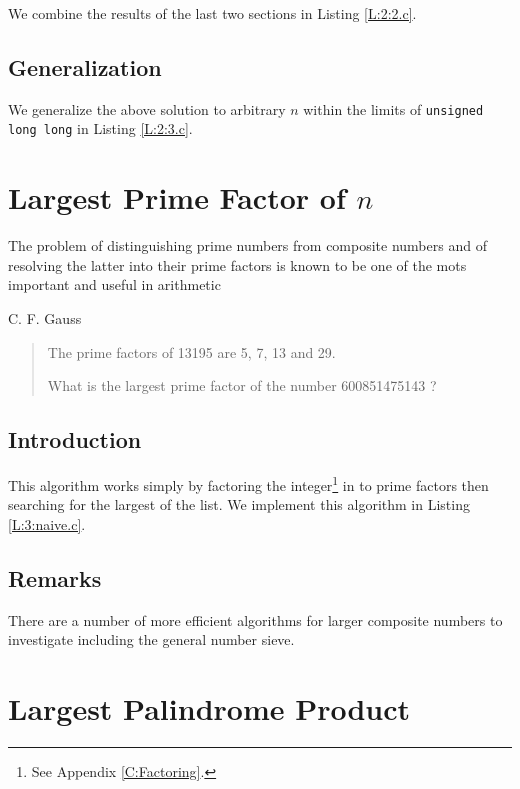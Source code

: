\documentclass[oneside,12pt]{book}   	%
\newcounter{ex}
\newcounter{pr}
\theoremstyle{definition}
\begin{document}
\begin{spacing}{1.618}
		We combine the results of the last two sections in Listing \ref{L:2:2.c}. 
	
		

	\section{Generalization}
	
		We generalize the above solution to arbitrary $n$ within the limits of \texttt{unsigned long long} in Listing \ref{L:2:3.c}. 
		
		

	\chapter{Largest Prime Factor of $n$}
		\epigraph{The problem of distinguishing prime numbers from composite numbers and of resolving the latter into their prime factors is known to be one of the mots important and useful in arithmetic}{C. F. Gauss}
		\begin{quote}
			The prime factors of 13195 are 5, 7, 13 and 29.

			What is the largest prime factor of the number 600851475143 ?
		\end{quote}
	
		\section{Introduction}
			This algorithm works simply by factoring the integer\footnote{See Appendix \ref{C:Factoring}.} in to prime factors then searching for the largest of the list.  We implement this algorithm in Listing \ref{L:3:naive.c}. 
			
			
		
		\section{Remarks}
		
			There are a number of more efficient algorithms for larger composite numbers to investigate including the general number sieve. 

	\chapter{Largest Palindrome Product}
	

\end{spacing}
\end{document}
